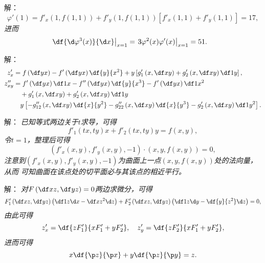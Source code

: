 \begin{frame}
	\linespread{1.5}
	
	\bigskip
	
	\small 解：\it
	$$\varphi'(1)=f'_x(1,f(1,1))+f'_y(1,f(1,1))[f'_x(1,1)+f'_y(1,1)]
	=17,$$
	进而
	\begin{align*}
		\left.\df{\d\varphi^3(x)}{\d x}\right|_{x=1}
		&=\left.3\varphi^2(x)\varphi'(x)\right|_{x=1}=51.
	\end{align*}
	\fin
\end{frame}

\begin{frame}
	\linespread{1.5}

	\bigskip
	
	\small 解：\it
	\begin{align*}
		z'_x&=f\left(\df yx\right)-f'\left(\df yx\right)\df{y}{x^2}
		+y\left[g'_1\left(x,\df xy\right)+g'_2\left(x,\df xy\right)\df1y\right],\\
		z''_{xy}&=f'\left(\df yx\right)\df1x
		-f''\left(\df yx\right)\df{y}{x^3}-f'\left(\df yx\right)\df1{x^2}\\
		&\quad+g'_1\left(x,\df xy\right)
		+g'_2\left(x,\df xy\right)\df1y\\
		&\quad y\left[-g''_{12}\left(x,\df xy\right)\df{x}{y^2}-g''_{22}\left(x,\df
		xy\right)\df{x}{y^3}-g'_2\left(x,\df xy\right)\df1{y^2}\right].
	\end{align*}
	\fin
\end{frame}

\begin{frame}
	\linespread{1.5}

	\bigskip
	
	\small 解：\it
	已知等式两边关于$t$求导，可得
	$$f'_1(tx,ty)x+f'_2(tx,ty)y=f(x,y),$$
	令$t=1$，整理后可得
	$$(f'_x(x,y),f'_y(x,y),-1)\cdot(x,y,f(x,y))=0,$$
	注意到$(f'_x(x,y),f'_y(x,y),-1)$为曲面上一点$(x,y,f(x,y))$处的法向量，从而
	可知曲面在该点处的切平面必与其该点的相近平行。\fin
\end{frame}

\begin{frame}
	\linespread{1.5}

	\bigskip
	
	\small 解：\it
	对$F\left(\df xz,\df yz\right)=0$两边求微分，可得
	$$F'_1\left(\df xz,\df yz\right)\left(\df1z\d x-\df x{z^2}\d z\right)
	+F'_2\left(\df xz,\df yz\right)\left(\df1z\d y
	-\df{y}{z^2}\d z\right)=0,$$
	由此可得
	$$
	z'_x=\df{zF'_1}{xF'_1+yF'_2},\quad
	z'_y=\df{zF'_2}{xF'_1+yF'_2},
	$$
	进而可得
	$$x\df{\p z}{\p x}+y\df{\p z}{\p y}=z.$$\fin
\end{frame}

